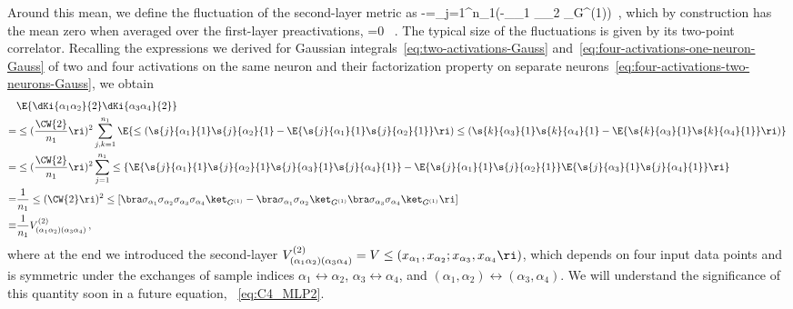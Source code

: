 Around this mean, we define the fluctuation of the second-layer metric as
\be\label{eq:second-layer-mean-fluctuation}
\equiv {}-=\sum_{j=1}^{n_1}\le(-\bra \sigma_{\alpha_1} \sigma_{\alpha_2} \ket_{G^{(1)}}\ri)\, ,
\ee
which by construction has the mean zero when averaged over the first-layer preactivations,
\be\label{eq:meanzero}
=0 \, .
\ee
The typical size of the fluctuations is given by its two-point correlator. Recalling the expressions we derived for Gaussian integrals~\eqref{eq:two-activations-Gauss} and~\eqref{eq:four-activations-one-neuron-Gauss} of two and four activations on the same neuron and their factorization property on separate neurons~\eqref{eq:four-activations-two-neurons-Gauss}, we obtain
\begin{align}\label{eq:second-layer-metric-fluctuation-two-point-function}
&\E{\dKi{\alpha_1\alpha_2}{2}\dKi{\alpha_3\alpha_4}{2}}\, \\
=&\le(\frac{\CW{2}}{n_1}\ri)^2  \sum_{j,k=1}^{n_1} \E{\le(\s{j}{\alpha_1}{1}\s{j}{\alpha_2}{1}-  \E{ \s{j}{\alpha_1}{1}\s{j}{\alpha_2}{1}}\ri) \le(\s{k}{\alpha_3}{1}\s{k}{\alpha_4}{1}-  \E{ \s{k}{\alpha_3}{1}\s{k}{\alpha_4}{1}}\ri) } \,  \nonumber\\
=&\le(\frac{\CW{2}}{n_1}\ri)^2  \sum_{j=1}^{n_1}  \le\{\E{ \s{j}{\alpha_1}{1}\s{j}{\alpha_2}{1}\s{j}{\alpha_3}{1}\s{j}{\alpha_4}{1} }  - \E{ \s{j}{\alpha_1}{1}\s{j}{\alpha_2}{1}}\E{\s{j}{\alpha_3}{1}\s{j}{\alpha_4}{1} }\ri\} \,  \nonumber\\
=& \frac{1}{n_1} \le(\CW{2}\ri)^2  \le[ \bra\sigma_{\alpha_1} \sigma_{\alpha_2} \sigma_{\alpha_3} \sigma_{\alpha_4}\ket_{G^{(1)}}  - \bra\sigma_{\alpha_1} \sigma_{\alpha_2}\ket_{G^{(1)}}\bra\sigma_{\alpha_3} \sigma_{\alpha_4}\ket_{G^{(1)}} \ri]\,   \notag \\
\equiv&\frac{1}{n_1}V^{(2)}_{(\alpha_1\alpha_2)(\alpha_3\alpha_4)}\,, \nonumber
\end{align}
where at the end we introduced the second-layer  $V^{(2)}_{(\alpha_1\alpha_2)(\alpha_3\alpha_4)}=V\le(x_{\alpha_1},x_{\alpha_2}; x_{\alpha_3},x_{\alpha_4}\ri)$, which depends on four input data points and is symmetric under the exchanges of sample indices $\alpha_1\leftrightarrow\alpha_2$, $\alpha_3\leftrightarrow\alpha_4$, and $(\alpha_1,\alpha_2)\leftrightarrow(\alpha_3,\alpha_4)$. We will understand the significance of this quantity soon in a future equation, ~\eqref{eq:C4_MLP2}.


